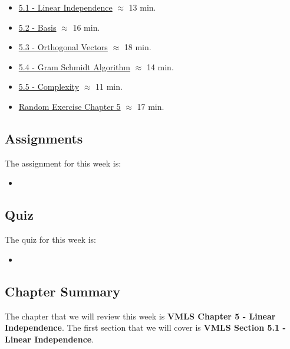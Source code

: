 \begin{itemize}
    \item \href{https://applied.cs.colorado.edu/mod/hvp/view.php?id=50717}{5.1 - Linear Independence} $\approx$ 13 min.
    \item \href{https://applied.cs.colorado.edu/mod/hvp/view.php?id=50718}{5.2 - Basis} $\approx$ 16 min.
    \item \href{https://applied.cs.colorado.edu/mod/hvp/view.php?id=50719}{5.3 - Orthogonal Vectors} $\approx$ 18 min.
    \item \href{https://applied.cs.colorado.edu/mod/hvp/view.php?id=50720}{5.4 - Gram Schmidt Algorithm} $\approx$ 14 min.
    \item \href{https://applied.cs.colorado.edu/mod/hvp/view.php?id=50721}{5.5 - Complexity} $\approx$ 11 min.
    \item \href{https://applied.cs.colorado.edu/mod/hvp/view.php?id=50722}{Random Exercise Chapter 5} $\approx$ 17 min.
\end{itemize}

\subsection{Assignments}

The assignment for this week is:

\begin{itemize}
    \item {}
\end{itemize}

\subsection{Quiz}

The quiz for this week is:

\begin{itemize}
    \item {}
\end{itemize}

\newpage

\subsection{Chapter Summary}

The chapter that we will review this week is \textbf{VMLS Chapter 5 - Linear Independence}. The first section that we will cover is \textbf{VMLS Section 5.1 - Linear Independence}.

